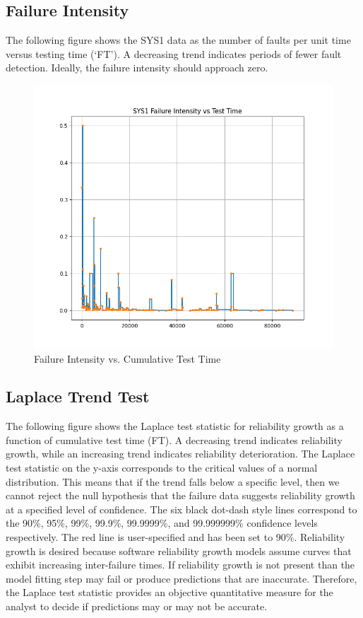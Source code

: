 \documentclass{article}
\begin{document}
\newpage
\subsection{Failure Intensity}
The following figure shows the SYS1 data as the number of faults per unit time versus testing time (`FT'). A decreasing trend indicates periods of fewer fault detection. Ideally, the failure intensity should approach zero.

\begin{figure}[h!]
\centering
\includegraphics[width=\textwidth]{fiplot1.png}
\caption{Failure Intensity vs. Cumulative Test Time}
\label{fig:fiplot}
\end{figure}



\newpage
\subsection{Laplace Trend Test}
The following figure shows the Laplace test statistic for reliability growth as a function of cumulative test time (FT). A decreasing trend indicates reliability growth, while an increasing trend indicates reliability deterioration. The Laplace test statistic on the y-axis corresponds to the critical values of a normal distribution. This means that if the trend falls below a specific level, then we cannot reject the null hypothesis that the failure data suggests reliability growth at a specified level of confidence. The six black dot-dash style
lines correspond to the 90\%, 95\%, 99\%, 99.9\%, 99.9999\%, and 99.999999\% confidence levels respectively. The red line is user-specified and has been set to 90\%. Reliability growth is desired because software reliability growth models assume curves that exhibit increasing inter-failure times. If reliability growth is not present than the model fitting step may fail or produce predictions that are inaccurate. Therefore, the Laplace test statistic provides an objective quantitative measure for the analyst to decide if predictions may or may not be accurate.
\end{document}
